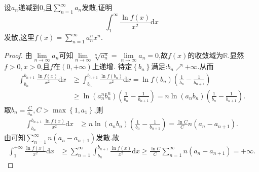 \documentclass[../../main.tex]{subfiles}
\begin{document}
\begin{example}
设$a_n$递减到$0$,且$\sum\limits_{n=1}^\infty a_n$发散,证明
$$\int_1^\infty \frac{\ln f(x)}{x^2}\mathrm{d}x$$
发散,这里$f(x)=\sum\limits_{n=1}^\infty a_n^n x^n$.
\end{example}
\begin{proof}
由$\lim\limits_{n\rightarrow \infty}a_n$可知$\lim\limits_{n\rightarrow \infty}\sqrt[n]{a_{n}^{n}}=\lim\limits_{n\rightarrow \infty}a_n=0$,故$f\left( x \right)$的收敛域为$\mathbb{R}$.显然$f>0,x>0$,且$f$在$\left( 0,+\infty \right)$上递增.
待定$\left\{ b_n \right\}$满足:$b_n\nearrow +\infty$.从而
\begin{align*}
\int_{b_n}^{b_{n+1}}{\frac{\ln f\left( x \right)}{x^2}\mathrm{d}x}&\geqslant \int_{b_n}^{b_{n+1}}{\frac{\ln f\left( b_n \right)}{x^2}\mathrm{d}x}=\ln f\left( b_n \right) \left( \frac{1}{b_n}-\frac{1}{b_{n+1}} \right) \\
&\geqslant \ln \left( a_{n}^{n}b_{n}^{n} \right) \left( \frac{1}{b_n}-\frac{1}{b_{n+1}} \right) =n\ln \left( a_nb_n \right) \left( \frac{1}{b_n}-\frac{1}{b_{n+1}} \right) .
\end{align*}
取$b_n=\frac{C}{a_n},C>\max \left\{ 1,a_1 \right\}$,则
\begin{align*}
\int_{b_n}^{b_{n+1}}{\frac{\ln f\left( x \right)}{x^2}\mathrm{d}x}&\geqslant n\ln \left( a_nb_n \right) \left( \frac{1}{b_n}-\frac{1}{b_{n+1}} \right) =\frac{\ln C}{C}n\left( a_n-a_{n+1} \right) .
\end{align*}
由可知$\sum_{n=1}^{\infty}{n\left( a_n-a_{n+1} \right)}$发散.故
\begin{align*}
\int_1^{+\infty}{\frac{\ln f\left( x \right)}{x^2}\mathrm{d}x}&\geqslant \sum_{n=1}^{\infty}{\int_{b_n}^{b_{n+1}}{\frac{\ln f\left( x \right)}{x^2}\mathrm{d}x}}\geqslant \frac{\ln C}{C}\sum_{n=1}^{\infty}{n\left( a_n-a_{n+1} \right)}=+\infty .
\end{align*}

\end{proof}
\end{document}
